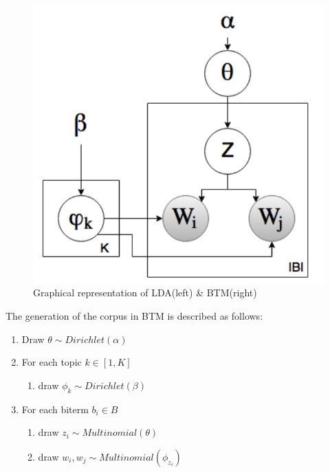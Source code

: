 \begin{figure}[H]
\begin{minipage}[t]{0.5\linewidth}
        \includegraphics[scale=0.5]{images/BTM.png}
    \end{minipage}
    \label{fig:7}
    \caption{Graphical representation of LDA(left) \& BTM(right)  \cite{jonsson2015evaluation}}
\end{figure}

The generation of the corpus in BTM is described as follows\cite{cheng2014btm}:

\begin{enumerate}
    \item Draw $\theta\sim Dirichlet(\alpha)$
    \item For each topic $k\in[1,K]$
    \begin{enumerate}
        \item draw $\phi_k\sim Dirichlet(\beta)$
    \end{enumerate}
    \item For each biterm $b_i\in B$
    \begin{enumerate}
        \item draw $z_i\sim Multinomial(\theta)$
        \item draw $w_i,w_j\sim Multinomial(\phi_{z_i})$
    \end{enumerate}
\end{enumerate}

